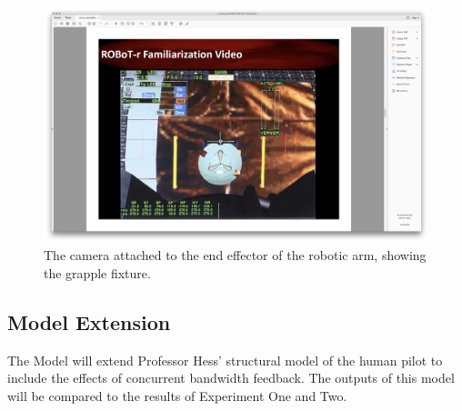 \documentclass[float=false, crop=false]{standalone}
\begin{document}
\begin{figure}[tb!]
    \begin{center}
        \includegraphics[trim={13cm 5cm 22cm 15.5cm},clip,width=\linewidth]{./../img/Screen Shot 2018-07-26 at 1.43.05 PM.png}
        \caption{The camera attached to the end effector of the robotic arm, showing the grapple fixture.}
    \end{center}
\end{figure}




\subsection{Model Extension}
The Model will extend Professor Hess’ structural model of the human pilot to include the effects of concurrent bandwidth feedback.
The outputs of this model will be compared to the results of Experiment One and Two.
\end{document}
